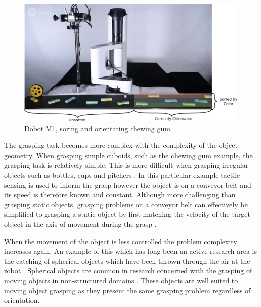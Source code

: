 \begin{figure}
    \centering
    \includegraphics[width=.8\textwidth]{Images/Sorting.png}
    \caption{Dobot M1, soring and orientating chewing gum}
    \label{fig:SortingChewingGum}
\end{figure}

The grasping task becomes more complex with the complexity of the object geometry. When grasping simple cuboids, such as the chewing gum example, the grasping task is relatively simple. This is more difficult when grasping irregular objects such as bottles, cups and pitchers \cite{ConveyorUnknownObject}. In this particular example tactile sensing is used to inform the grasp however the object is on a conveyor belt and its speed is therefore known and constant. Although more challenging than grasping static objects, grasping problems on a conveyor belt can effectively be simplified to grasping a static object by first matching the velocity of the target object in the axis of movement during the grasp \cite{FingertipEmitterReceiverMovingObjectII,FingertipEmitterReceiverMovingObject}. 

When the movement of the object is less controlled the problem complexity increases again. An example of this which has long been an active research area is the catching of spherical objects which have been thrown through the air at the robot \cite{1991BallTracking}. Spherical objects are common in research concerned with the grasping of moving objects in non-structured domains \cite{DisneyRobot,RollinJustin,EarlyAnticipation}. These objects are well suited to moving object grasping as they present the same grasping problem regardless of orientation. 

